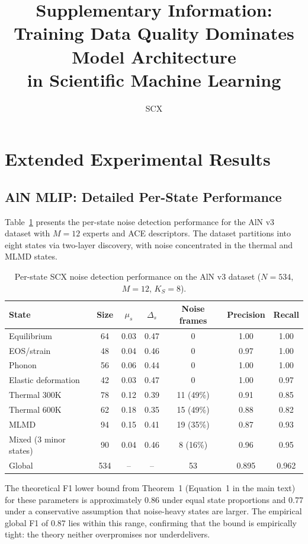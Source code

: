 \documentclass[11pt,a4paper]{article}
\title{Supplementary Information: \\ Training Data Quality Dominates Model Architecture \\ in Scientific Machine Learning}
\author{SCX}
\begin{document}
\maketitle

\tableofcontents

\section{Extended Experimental Results}
\label{sec:S1}

\subsection{AlN MLIP: Detailed Per-State Performance}

Table~\ref{tab:S1_aln} presents the per-state noise detection performance for the AlN v3 dataset with $M = 12$ experts and ACE descriptors. The dataset partitions into eight states via two-layer discovery, with noise concentrated in the thermal and MLMD states.

\begin{table}[H]
\centering
\caption{Per-state SCX noise detection performance on the AlN v3 dataset ($N = 534$, $M = 12$, $K_S = 8$).}
\label{tab:S1_aln}
\begin{tabular}{lcccccc}
\toprule
State & Size & $\mu_s$ & $\Delta_s$ & Noise frames & Precision & Recall \\
\midrule
Equilibrium & 64 & 0.03 & 0.47 & 0 & 1.00 & 1.00 \\
EOS/strain & 48 & 0.04 & 0.46 & 0 & 0.97 & 1.00 \\
Phonon & 56 & 0.06 & 0.44 & 0 & 1.00 & 1.00 \\
Elastic deformation & 42 & 0.03 & 0.47 & 0 & 1.00 & 0.97 \\
Thermal 300K & 78 & 0.12 & 0.39 & 11 (49\%) & 0.91 & 0.85 \\
Thermal 600K & 62 & 0.18 & 0.35 & 15 (49\%) & 0.88 & 0.82 \\
MLMD & 94 & 0.15 & 0.41 & 19 (35\%) & 0.87 & 0.93 \\
Mixed (3 minor states) & 90 & 0.04 & 0.46 & 8 (16\%) & 0.96 & 0.95 \\
\midrule
Global & 534 & -- & -- & 53 & 0.895 & 0.962 \\
\bottomrule
\end{tabular}
\end{table}

The theoretical F1 lower bound from Theorem~1 (Equation~1 in the main text) for these parameters is approximately 0.86 under equal state proportions and 0.77 under a conservative assumption that noise-heavy states are larger. The empirical global F1 of 0.87 lies within this range, confirming that the bound is empirically tight: the theory neither overpromises nor underdelivers.
\end{document}
